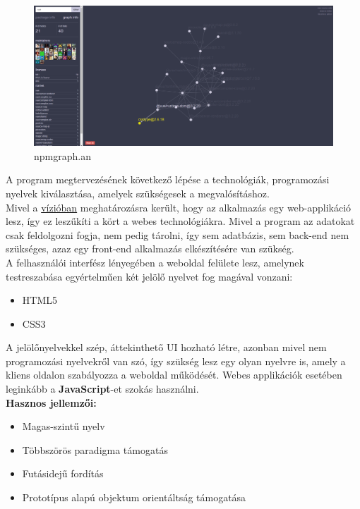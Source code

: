 	\begin{flushright}
		\cite{anvaka-npmgraph}
	\end{flushright}
	
	\begin{figure}[!h]
		\centering
		\includegraphics[scale=0.15]{images/anvaka_npmgraph.png}
		\caption{npmgraph.an}
		\label{fig:sw-npmgraph}
	\end{figure}
	
	\pagebreak


A program megtervezésének következő lépése a technológiák, programozási nyelvek kiválasztása, amelyek szükségesek a megvalósításhoz.\\

Mivel a \hyperlink{section.2.2}{vízióban} meghatározásra került, hogy az alkalmazás egy web-applikáció lesz, így ez leszűkíti a kört a webes technológiákra. Mivel a program az adatokat csak feldolgozni fogja, nem pedig tárolni, így sem adatbázis, sem back-end nem szükséges, azaz egy front-end alkalmazás elkészítésére van szükség.\\

A felhasználói interfész lényegében a weboldal felülete lesz, amelynek testreszabása egyértelműen két jelölő nyelvet fog magával vonzani:
\begin{itemize}
	\item HTML5
	\item CSS3
\end{itemize}

A jelölőnyelvekkel szép, áttekinthető UI hozható létre, azonban mivel nem programozási nyelvekről van szó, így szükség lesz egy olyan nyelvre is, amely a kliens oldalon szabályozza a weboldal működését. Webes applikációk esetében leginkább a \textbf{JavaScript}-et szokás használni.\\

\textbf{Hasznos jellemzői:}
\begin{itemize}
	\item Magas-szintű nyelv
	\item Többszörös paradigma támogatás
	\item Futásidejű fordítás
	\item Prototípus alapú objektum orientáltság támogatása
\end{itemize}
\begin{flushright}
	\cite{javascript}
\end{flushright}

